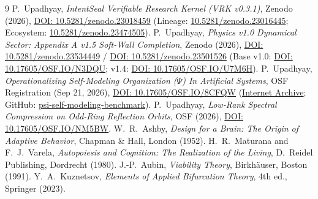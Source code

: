 \documentclass[11pt,a4paper]{article}
\theoremstyle{definition}
\begin{document}
\begin{thebibliography}{9}
 P.\ Upadhyay, \emph{IntentSeal Verifiable Research Kernel (VRK v0.3.1)}, Zenodo (2026), \href{https://doi.org/10.5281/zenodo.23018459}{DOI: 10.5281/zenodo.23018459} (Lineage: \href{https://doi.org/10.5281/zenodo.23016445}{10.5281/zenodo.23016445}; Ecosystem: \href{https://doi.org/10.5281/zenodo.23474505}{10.5281/zenodo.23474505}).
 P.\ Upadhyay, \emph{Physics v1.0 Dynamical Sector: Appendix A v1.5 Soft-Wall Completion}, Zenodo (2026), \href{https://doi.org/10.5281/zenodo.23534449}{DOI: 10.5281/zenodo.23534449} / \href{https://doi.org/10.5281/zenodo.23501526}{DOI: 10.5281/zenodo.23501526} (Base v1.0: \href{https://doi.org/10.17605/OSF.IO/N3DQU}{DOI: 10.17605/OSF.IO/N3DQU}; v1.4: \href{https://doi.org/10.17605/OSF.IO/U7M6H}{DOI: 10.17605/OSF.IO/U7M6H}).
 P.\ Upadhyay, \emph{Operationalizing Self-Modeling Organization ($\Psi$) In Artificial Systems}, OSF Registration (Sep 21, 2026), \href{https://doi.org/10.17605/OSF.IO/8CFQW}{DOI: 10.17605/OSF.IO/8CFQW} (\href{https://archive.org/details/psi-self-modeling-organization}{Internet Archive}; GitHub: \href{https://github.com/reggaesharkk/psi-self-modeling-benchmark}{psi-self-modeling-benchmark}).
 P.\ Upadhyay, \emph{Low-Rank Spectral Compression on Odd-Ring Reflection Orbits}, OSF (2026), \href{https://doi.org/10.17605/OSF.IO/NM5BW}{DOI: 10.17605/OSF.IO/NM5BW}.
 W.\ R.\ Ashby, \emph{Design for a Brain: The Origin of Adaptive Behavior}, Chapman \& Hall, London (1952).
 H.\ R.\ Maturana and F.\ J.\ Varela, \emph{Autopoiesis and Cognition: The Realization of the Living}, D.\ Reidel Publishing, Dordrecht (1980).
 J.-P.\ Aubin, \emph{Viability Theory}, Birkh\"auser, Boston (1991).
 Y.\ A.\ Kuznetsov, \emph{Elements of Applied Bifurcation Theory}, 4th ed., Springer (2023).
\end{thebibliography}
\end{document}
